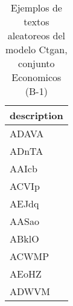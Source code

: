 \begin{table}[H]
\centering
\fontsize{8}{14}\selectfont
\caption{Ejemplos de textos aleatoreos del modelo Ctgan, conjunto Economicos (B-1)}
\label{table-sample10-economicos-b-1-ctgan-text}
\begin{tabular}{|m{50em}|}
\hline
\rowcolor[gray]{0.8}
description \\
\hline ADAVA \\
\hline ADnTA \\
\hline AAIcb \\
\hline ACVIp \\
\hline AEJdq \\
\hline AASao \\
\hline ABklO \\
\hline ACWMP \\
\hline AEoHZ \\
\hline ADWVM \\
\hline
\end{tabular}
\end{table}
